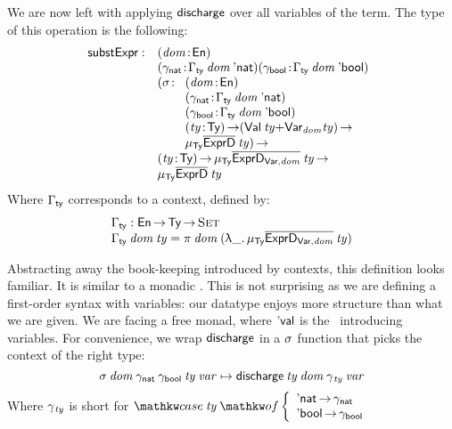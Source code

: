 We are now left with applying $\discharge$ over all variables of the
term. The type of this operation is the following:
%
\[
\begin{array}{@{}ll}
\substH  : & \PITEL{\V{dom}}{\EnumU} \\
           & \PITEL{\V{\gammaNat}}{\GammaSpi{\V{dom}}{\Enat}} 
             \PITEL{\V{\gammaBool}}{\GammaSpi{\V{dom}}{\Ebool}} \\
           & \begin{array}{@{}ll}
             \PI{\V{\sigma}}{& \PITEL{\V{dom}}{\EnumU} \\
                             & \PITEL{\V{\gammaNat}}
                                     {\GammaSpi{\V{dom}}{\Enat}} \\
                             & \PITEL{\V{\gammaBool}}
                                     {\GammaSpi{\V{dom}}{\Ebool}} \\
                             & \PI{\V{ty}}{\Ty} (\SUM{\Val{\V{ty}}}{\Var{\V{dom}}{\V{ty}}}) \To \\
                             & \IMu{\Ty}{\toIDesc{\HExprD}}{\V{ty}}}
             \end{array}\\
          & \PI{\V{ty}}{\Ty}
            \IMu{\Ty}{\toIDesc{\HExprVarD{\V{dom}}}}{\V{ty}} \To \\
          & \IMu{\Ty}{\toIDesc{\HExprD}}{\V{ty}}
\end{array}
\]
%
Where $\SYMBGammaSpi$ corresponds to a context, defined by:
%
\[\stk{
\SYMBGammaSpi : \EnumU \To \Ty \To \Set                                             \\
\GammaSpi{\V{dom}}{\V{ty}} = \spi{\V{dom}}{(\LAM{\_} \IMu{\Ty}{\toIDesc{\HExprVarD{\V{dom}}}}{\V{ty}})} 
}\]


Abstracting away the book-keeping introduced by contexts, this
definition looks familiar. It is similar to a monadic \bind. This is
not surprising as we are defining a first-order syntax with variables:
our datatype enjoys more structure than what we are given. We are
facing a free monad, where $\SYMBEval$ is the \return\ introducing
variables. For convenience, we wrap $\discharge$ in a $\V{\sigma}$
function that picks the context of the right type:
%
\[
\F{$\sigma$}\: \V{dom}\: \gammaNat\: \gammaBool\: \V{ty}\: \V{var} \mapsto
    \F{$\discharge$}\: \V{ty}\: \V{dom}\: \F{$\gamma$}_{\V{ty}}\: \V{var} 
\]
%
Where $\F{$\gamma$}_{\V{ty}}$ is short for
 $\caseB{\V{ty}}{\Enat  \To \gammaNat \\
                 \Ebool \To \gammaBool}$

